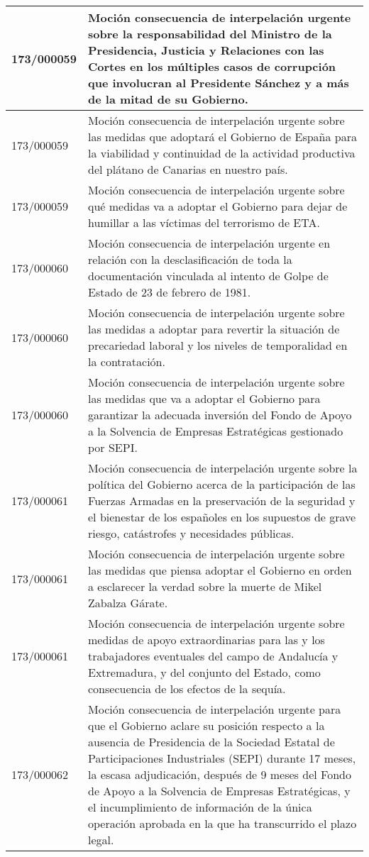 {\begin{table}[H]
\begin{center}
\begin{tabularx}{\linewidth}{| l | X |}
\hline
173/000059 & Moción consecuencia de interpelación urgente sobre la responsabilidad del Ministro de la Presidencia, Justicia y Relaciones con las Cortes en los múltiples casos de corrupción que involucran al Presidente Sánchez y a más de la mitad de su Gobierno. \\
\hline
173/000059 & Moción consecuencia de interpelación urgente sobre las medidas que adoptará el Gobierno de España para la viabilidad y continuidad de la actividad productiva del plátano de Canarias en nuestro país. \\
\hline
173/000059 & Moción consecuencia de interpelación urgente sobre qué medidas va a adoptar el Gobierno para dejar de humillar a las víctimas del terrorismo de ETA. \\
\hline
173/000060 & Moción consecuencia de interpelación urgente en relación con la desclasificación de toda la documentación vinculada al intento de Golpe de Estado de 23 de febrero de 1981. \\
\hline
173/000060 & Moción consecuencia de interpelación urgente sobre las medidas a adoptar para revertir la situación de precariedad laboral y los niveles de temporalidad en la contratación. \\
\hline
173/000060 & Moción consecuencia de interpelación urgente sobre las medidas que va a adoptar el Gobierno para garantizar la adecuada inversión del Fondo de Apoyo a la Solvencia de Empresas Estratégicas gestionado por SEPI. \\
\hline
173/000061 & Moción consecuencia de interpelación urgente sobre la política del Gobierno acerca de la participación de las Fuerzas Armadas en la preservación de la seguridad y el bienestar de los españoles en los supuestos de grave riesgo, catástrofes y necesidades públicas. \\
\hline
173/000061 & Moción consecuencia de interpelación urgente sobre las medidas que piensa adoptar el Gobierno en orden a esclarecer la verdad sobre la muerte de Mikel Zabalza Gárate. \\
\hline
173/000061 & Moción consecuencia de interpelación urgente sobre medidas de apoyo extraordinarias para las y los trabajadores eventuales del campo de Andalucía y Extremadura, y del conjunto del Estado, como consecuencia de los efectos de la sequía. \\
\hline
173/000062 & Moción consecuencia de interpelación urgente para que el Gobierno aclare su posición respecto a la ausencia de Presidencia de la Sociedad Estatal de Participaciones Industriales (SEPI) durante 17 meses, la escasa adjudicación, después de 9 meses del Fondo de Apoyo a la Solvencia de Empresas Estratégicas, y el incumplimiento de información de la única operación aprobada en la que ha transcurrido el plazo legal. \\

\end{tabularx}
\end{center}
\end{table}}
